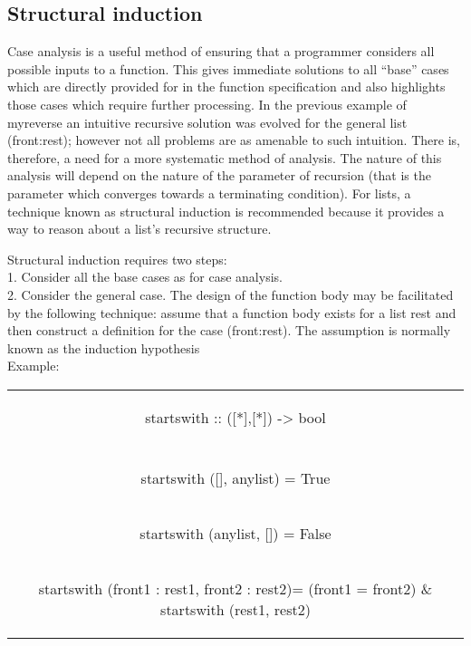 \documentclass[11pt]{article}
\begin{document}
\subsection{Structural induction}

Case analysis is a useful method of ensuring that a programmer considers all possible
inputs to a function. This gives immediate solutions to all “base” cases which
are directly provided for in the function specification and also highlights those
cases which require further processing. In the previous example of myreverse an
intuitive recursive solution was evolved for the general list (front:rest); however
not all problems are as amenable to such intuition. There is, therefore, a need for
a more systematic method of analysis. The nature of this analysis will depend on
the nature of the parameter of recursion (that is the parameter which converges
towards a terminating condition). For lists, a technique known as structural induction
is recommended because it provides a way to reason about a list’s recursive
structure.

Structural induction requires two steps:\\
1. Consider all the base cases as for case analysis.\\
2. Consider the general case. The design of the function body may be facilitated
by the following technique: assume that a function body exists for a list rest
and then construct a definition for the case (front:rest). The assumption
is normally known as the induction hypothesis\\

Example:\\

\begin{tabular}{ |c| } 
 \hline
\begin{flushleft} startswith :: ([*],[*]) -> bool \end{flushleft}\\
\\
\begin{flushleft}startswith ([], anylist) = True\end{flushleft}\\
\begin{flushleft}startswith (anylist, []) = False\end{flushleft}\\
\begin{flushleft}startswith (front1 : rest1, front2 : rest2)= (front1 = front2) \& startswith (rest1, rest2)\end{flushleft}\\
\hline
\end{tabular}
\label{Tab:1}
\end{document}
